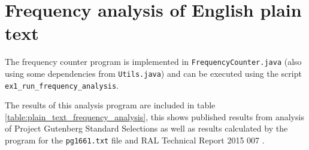 \documentclass[a4paper]{article}
\title{\DOCTITLE}
\author{\DOCAUTHOR}
\date{\DOCDATE}
\begin{document}
\section{Frequency analysis of English plain text}

The frequency counter program is implemented in \texttt{FrequencyCounter.java}
(also using some dependencies from \texttt{Utils.java}) and can be executed
using the script \texttt{ex1\_run\_frequency\_analysis}.

The results of this analysis program are included in table
\ref{table:plain_text_frequency_analysis}, this shows published results from
analysis of Project Gutenberg Standard Selections \cite{gutenberg} as well as
results calculated by the program for the \texttt{pg1661.txt} file and RAL
Technical Report 2015 007 \cite{ral_tr_2015_007}.
\end{document}
